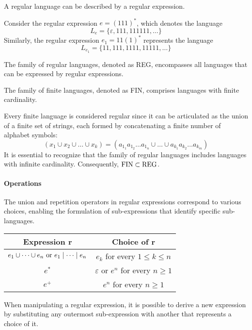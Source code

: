 \begin{definition}
    A regular language can be described by a regular expression.
\end{definition}

\begin{example}
    Consider the regular expression $e=(111)^{\ast}$, which denotes the language 
    \[L_e=\{\varepsilon,111,111111,\dots\}\]
    Similarly, the regular expression $e_1=11(1)^{\ast}$ represents the language 
    \[L_{e_1}=\{11,111,1111,11111,\dots\}\]
\end{example}
\begin{definition}
    The family of regular languages, denoted as REG, encompasses all languages that can be expressed by regular expressions.
\end{definition}
\begin{definition}
    The family of finite languages, denoted as FIN, comprises languages with finite cardinality.
\end{definition}
Every finite language is considered regular  since it can be articulated as the union of a finite set of strings, each formed by concatenating a finite number of alphabet symbols:
\[\left(x_1 \cup x_2 \cup \dots \cup x_k \right) = \left( a_{1_1}a_{1_2}\dots a_{1_n} \cup \dots \cup a_{k_1}a_{k_2}\dots a_{k_m} \right)\]
It is essential to recognize that the family of regular languages includes languages with infinite cardinality. 
Consequently, $\textnormal{FIN} \subset \textnormal{REG}$.

\paragraph*{Operations}
The union and repetition operators in regular expressions correspond to various choices, enabling the formulation of sub-expressions that identify specific sub-languages.
\begin{table}[H]
    \centering
    \begin{tabular}{cc}
    \hline
    \textbf{Expression $\boldsymbol{r}$}                                    & \textbf{Choice of $\boldsymbol{r}$}                       \\ \hline
    $e_1 \cup \dots \cup e_n \textnormal{ or } e_1 \mid \dots \mid e_n$           & $e_k$ for every $1 \leq k \leq n$                         \\
    $e^{\ast}$                                                                 & $\varepsilon$ or $e^n$ for every $n \geq 1$               \\
    $e^{+}$                                                                 & $e^n$ for every $n \geq 1$                                \\ \hline
    \end{tabular}
\end{table}
When manipulating a regular expression, it is possible to derive a new expression by substituting any outermost sub-expression with another that represents a choice of it.

